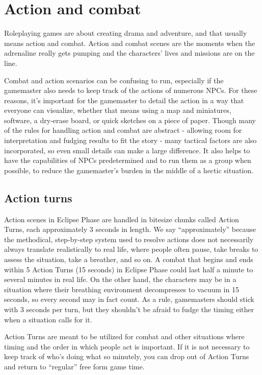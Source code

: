 
\chapter{Action and combat}
\label{chap:action-combat}

Roleplaying games are about creating drama and adventure, and that usually means action and combat. Action and combat scenes are the moments when the adrenaline really gets pumping and the characters’ lives and missions are on the line.

Combat and action scenarios can be confusing to run, especially if the gamemaster also needs to keep track of the actions of numerous NPCs. For these reasons, it’s important for the gamemaster to detail the action in a way that everyone can visualize, whether that means using a map and miniatures, software, a dry-erase board, or quick sketches on a piece of paper. Though many of the rules for handling action and combat are abstract - allowing room for interpretation and fudging results to fit the story - many tactical factors are also incorporated, so even small details can make a large difference. It also helps to have the capabilities of NPCs predetermined and to run them as a group when possible, to reduce the gamemaster’s burden in the middle of a hectic situation.


\section{Action turns}
\label{sec:combat-action-turns}

Action scenes in Eclipse Phase are handled in bitesize chunks called Action Turns, each approximately 3 seconds in length. We say ``approximately'' because the methodical, step-by-step system used to resolve actions does not necessarily always translate realistically to real life, where people often pause, take breaks to assess the situation, take a breather, and so on. A combat that begins and ends within 5 Action Turns (15 seconds) in Eclipse Phase could last half a minute to several minutes in real life. On the other hand, the characters may be in a situation where their breathing environment decompresses to vacuum in 15 seconds, so every second may in fact count. As a rule, gamemasters should stick with 3 seconds per turn, but they shouldn’t be afraid to fudge the timing either when a situation calls for it.

Action Turns are meant to be utilized for combat and other situations where timing and the order in which people act is important. If it is not necessary to keep track of who’s doing what so minutely, you can drop out of Action Turns and return to ``regular'' free form game time.

